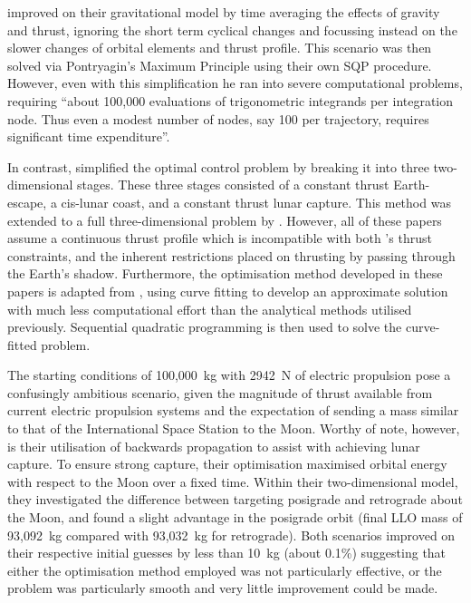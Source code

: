 \textcite{Guelman2000} improved on their gravitational model by time averaging the effects of gravity and thrust, ignoring the short term cyclical changes and focussing instead on the slower changes of orbital elements and thrust profile. This scenario was then solved via Pontryagin's Maximum Principle using their own SQP procedure. However, even with this simplification he ran into severe computational problems, requiring \enquote{about 100,000 evaluations of trigonometric integrands per integration node. Thus even a modest number of nodes, say 100 per trajectory, requires significant time expenditure}. 

In contrast, \textcite{Pierson1994} simplified the optimal control problem by breaking it into three two-dimensional stages. These three stages consisted of a constant thrust Earth-escape, a cis-lunar coast, and a constant thrust lunar capture. This method was extended to a full three-dimensional problem by \textcite{Kluever1995,Kluever1996,Kluever1997}. However, all of these papers assume a continuous thrust profile which is incompatible with both \BW's thrust constraints, and the inherent restrictions placed on thrusting by passing through the Earth's shadow. Furthermore, the optimisation method developed in these papers is adapted from \textcite{Edelbaum1964}, using curve fitting to develop an approximate solution with much less computational effort than the analytical methods utilised previously. Sequential quadratic programming is then used to solve the curve-fitted problem.

The starting conditions of 100,000~kg with 2942~N of electric propulsion pose a confusingly ambitious scenario, given the magnitude of thrust available from current electric propulsion systems and the expectation of sending a mass similar to that of the International Space Station to the Moon. Worthy of note, however, is their utilisation of backwards propagation to assist with achieving lunar capture. To ensure strong capture, their optimisation maximised orbital energy with respect to the Moon over a fixed time. Within their two-dimensional model, they investigated the difference between targeting posigrade and retrograde about the Moon, and found a slight advantage in the posigrade orbit (final LLO mass of 93,092~kg compared with 93,032~kg for retrograde). Both scenarios improved on their respective initial guesses by less than 10~kg (about 0.1\%) suggesting that either the optimisation method employed was not particularly effective, or the problem was particularly smooth and very little improvement could be made. 


